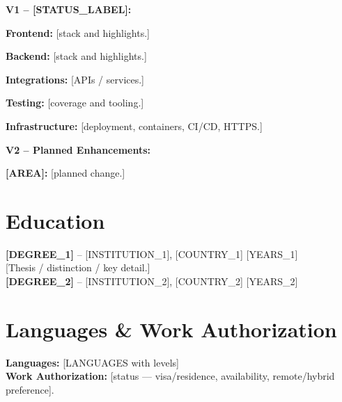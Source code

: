 \documentclass[10pt,a4paper]{article}
\begin{document}

\vspace{2pt}
\noindent \textcolor{redBlood}{\textbf{V1 -- [STATUS_LABEL]:}}

\vspace{2pt}
\noindent \textbf{Frontend:} [stack and highlights.]

\noindent \textbf{Backend:} [stack and highlights.]

\noindent \textbf{Integrations:} [APIs / services.]

\noindent \textbf{Testing:} [coverage and tooling.]

\noindent \textbf{Infrastructure:} [deployment, containers, CI/CD, HTTPS.]

\vspace{2pt}
\noindent \textcolor{redBlood}{\textbf{V2 -- Planned Enhancements:}}

\vspace{2pt}
\noindent \textbf{[AREA]:} [planned change.]

\section*{Education}
\noindent \textbf{[DEGREE_1]} -- [INSTITUTION_1], [COUNTRY_1] \hfill [YEARS_1]\\
\noindent \hspace*{1em} [Thesis / distinction / key detail.]\\
\noindent \textbf{[DEGREE_2]} -- [INSTITUTION_2], [COUNTRY_2] \hfill [YEARS_2]

\section*{Languages \& Work Authorization}
\noindent \textbf{Languages:} [LANGUAGES with levels]\\
\noindent \textbf{Work Authorization:} [status — visa/residence, availability, remote/hybrid preference].
\end{document}
